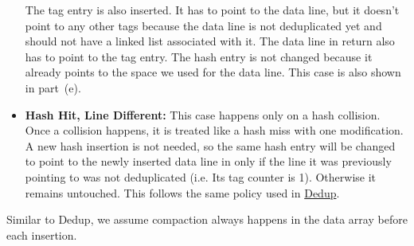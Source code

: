 \begin{itemize}
        The tag entry is also inserted. It has to point to the data line, but it doesn't point to any other tags because the data line is not deduplicated yet and should not have a linked list associated with it. The data line in return also has to point to the tag entry. The hash entry is not changed because it already points to the space we used for the data line. This case is also shown in part~(e).
    \item \textbf{Hash Hit, Line Different:} This case happens only on a hash collision. Once a collision happens, it is treated like a hash miss with one modification. A new hash insertion is not needed, so the same hash entry will be changed to point to the newly inserted data line in only if the line it was previously pointing to was not deduplicated (i.e. Its tag counter is 1). Otherwise it remains untouched. This follows the same policy used in \hyperref[ssec:DedupOperations]{Dedup}.
\end{itemize}
Similar to Dedup, we assume compaction always happens in the data array before each insertion.
